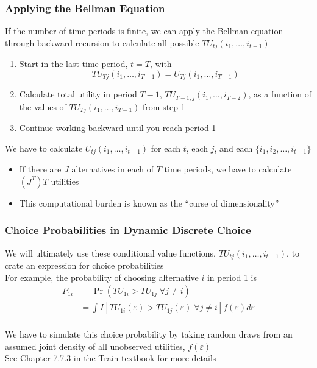 \documentclass{beamer}
\begin{document}
\begin{frame}\frametitle{Applying the Bellman Equation}
    If the number of time periods is finite, we can apply the Bellman equation through backward recursion to calculate all possible $TU_{tj}(i_1, \ldots, i_{t-1})$
    \begin{enumerate}
        \item Start in the last time period, $t = T$, with
        $$TU_{Tj}(i_1, \ldots, i_{T-1}) = U_{Tj}(i_1, \ldots, i_{T-1})$$
        \item Calculate total utility in period $T - 1$, $TU_{T-1,j}(i_1, \ldots, i_{T-2})$, as a function of the values of $TU_{Tj}(i_1, \ldots, i_{T-1})$ from step 1
        \item Continue working backward until you reach period 1
    \end{enumerate}
    \vspace{2ex}
    We have to calculate $U_{tj}(i_1, \ldots, i_{t-1})$ for each $t$, each $j$, and each $\{i_1, i_2, \ldots, i_{t-1}\}$
    \begin{itemize}
        \item If there are $J$ alternatives in each of $T$ time periods, we have to calculate $(J^T)T$ utilities
        \item This computational burden is known as the ``curse of dimensionality''
    \end{itemize}
\end{frame}

\begin{frame}\frametitle{Choice Probabilities in Dynamic Discrete Choice}
    We will ultimately use these conditional value functions, $TU_{tj}(i_1, \ldots, i_{t-1})$, to crate an expression for choice probabilities \\
    \vspace{2ex}
    For example, the probability of choosing alternative $i$ in period 1 is
    \begin{align*}
        P_{1i} &= \Pr(TU_{1i} > TU_{1j} \; \forall j \neq i) \\
        &= \int I \left[ TU_{1i}(\varepsilon) > TU_{1j}(\varepsilon) \; \forall j \neq i \right] f(\varepsilon) d \varepsilon
    \end{align*} \\
    \vspace{2ex}
    We have to simulate this choice probability by taking random draws from an assumed joint density of all unobserved utilities, $f(\varepsilon)$ \\
    \vspace{2ex}
    See Chapter 7.7.3 in the Train textbook for more details
\end{frame}
\end{document}
